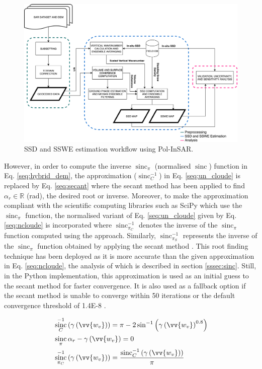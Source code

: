 \documentclass[12pt]{elsarticle}
\numberwithin{equation}{section}
\numberwithin{figure}{section}
\numberwithin{table}{section}
\DeclareMathOperator{\sinc}{sinc}
\begin{document}
\begin{figure}[htb]
    \centering
    \includegraphics[width=\textwidth]{Figures/Methods/SSD_Method.png}
    \caption{SSD and SSWE estimation workflow using Pol-InSAR.}
    \label{fig:ssd_method}
\end{figure}

However, in order to compute the inverse $\sinc_\pi$ (normalised $\sinc$) function in Eq. \eqref{seq:hybrid_dem}, the \cite{Cloude2010} approximation ($\sinc_C^{-1}$) in Eq. \eqref{seq:un_cloude} is replaced by Eq. \eqref{seq:secant} where the secant method \citep{Cheney2012} has been applied to find $\alpha_r \in \mathbb{R}$ (rad), the desired root or inverse. Moreover, to make the \cite{Cloude2010} approximation compliant with the scientific computing libraries such as SciPy \citep{Jones2001} which use the $\sinc_\pi$ function, the normalised variant of Eq. \eqref{seq:un_cloude} given by Eq. \eqref{seq:ncloude} is incorporated where $\sinc_{\pi_C}^{-1}$ denotes the inverse of the $\sinc_\pi$ function computed using the \cite{Cloude2010} approach. Similarly, $\sinc_{\pi_S}^{-1}$ represents the inverse of the $\sinc_\pi$ function obtained by applying the secant method \citep{Cheney2012, Jones2001}. This root finding technique has been deployed as it is more accurate than the given approximation in Eq. \eqref{seq:ncloude}, the analysis of which is described in section \ref{sssec:sinc}. Still, in the Python implementation, this approximation is used as an initial guess to the secant method for faster convergence. It is also used as a fallback option if the secant method is unable to converge within 50 iterations or the default convergence threshold of 1.4E-8 \citep{Jones2001}.

\begin{subequations}
    \centering
    \begin{align}
        \label{seq:un_cloude}
        & \sinc_C^{-1}\left(\gamma\left(\vv{w_v}\right)\right) = \pi - 2\sin^{-1}\left(\gamma\left(\vv{w_v}\right)^{0.8}\right) \\
        \label{seq:secant}
        & \sinc_\pi\alpha_r  - \gamma\left(\vv{w_v}\right) = 0 \\
        \label{seq:ncloude}
        & \sinc_{\pi_C}^{-1}\left(\gamma\left(\vv{w_v}\right)\right) = \frac{\sinc_C^{-1}\left(\gamma\left(\vv{w_v}\right)\right)}{\pi}
    \end{align}
\end{subequations}
\end{document}
